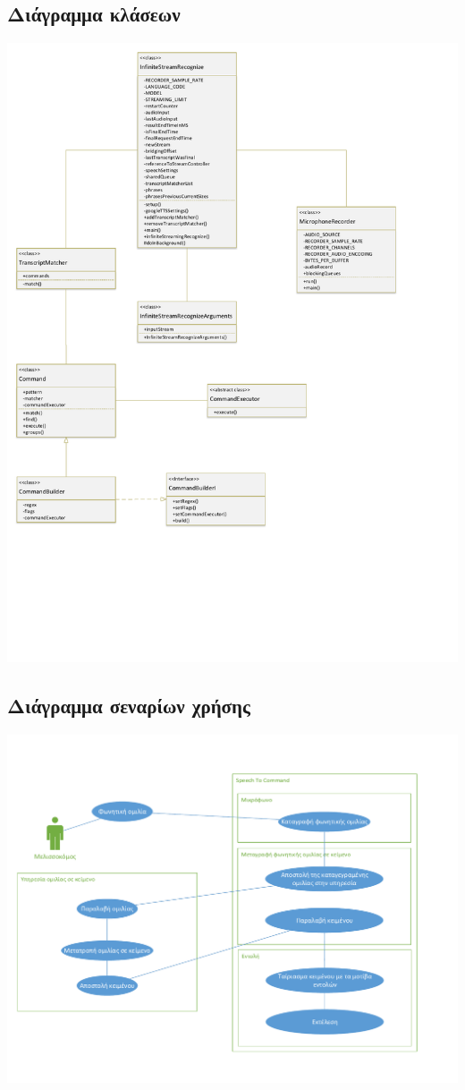 \documentclass[oneside, 12pt]{book}
\begin{document}
\subsection{Διάγραμμα κλάσεων}\label{sec:διάγραμμα-κλάσεων}
\includegraphics[scale=0.5]{uml/library_uml_class_diagram.pdf}
\newpage
\subsection{Διάγραμμα σεναρίων χρήσης}\label{sec:διάγραμμα-σεναρίων-χρήσης}
\includegraphics[scale=0.5]{uml/library_uml_use_case_diagram.pdf}
\newpage
\end{document}
